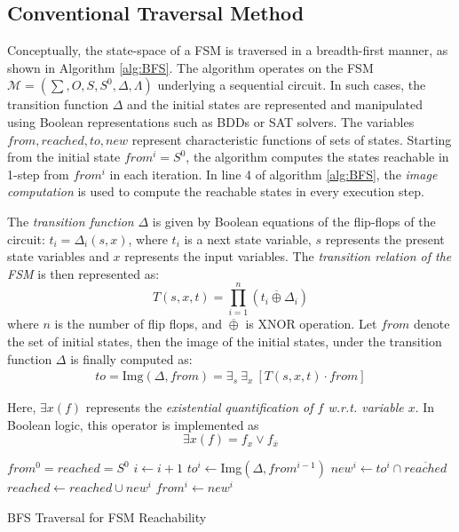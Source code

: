 \subsection{Conventional Traversal Method}
Conceptually, the state-space of a FSM is traversed in a breadth-first
manner, as shown in Algorithm \ref{alg:BFS}. %
The algorithm operates on the FSM $\mathcal{M} = (\sum, O, S, S^0,
\Delta, \Lambda)$ underlying a sequential circuit. In such cases, the
transition function $\Delta$ and the initial states are represented
and manipulated using Boolean representations such as BDDs or SAT
solvers. The variables $from, reached, to, new$ represent
characteristic functions of sets of states. Starting from the initial
state $from^i = S^0$, the algorithm computes the states reachable in
1-step from $from^i$ in each iteration. In line 4 of algorithm
\ref{alg:BFS}, the {\it image computation} is 
used to compute the reachable states in every execution step. 

The {\it transition function} $\Delta$ is given by Boolean equations
  of the flip-flops of the circuit: $t_i = \Delta_i(s, x)$, where
  $t_i$ is a next state variable, $s$ represents the present   state
  variables and $x$ represents the input variables. The {\it
    transition relation of the FSM} is then represented as:  
\begin{equation} 
T(s, x, t) =   \prod_{i=1}^{n} (t_i \overline{\oplus } \Delta_i)
\end{equation}
where $n$ is the number of flip flops, and $\overline{\oplus}$ is XNOR
operation. Let $from$ denote the set of initial states, then the
image of the initial states, under the transition function $\Delta$ is
finally computed as:
\begin{align}
\label{eqn:img}
to = \text{Img}(\Delta, from) = \exists _s ~\exists _x ~[ T(s, x, t)
  \cdot from ] 
\end{align}

Here, $\exists x (f)$ represents the {\it existential quantification
  of $f$ w.r.t. variable $x$}. In Boolean logic, this operator is implemented as
  $$\exists x (f) = f_x\lor f_{\overline{x}}$$


\IncMargin{1em}
\begin{algorithm}[hbt]
\SetAlgoNoLine
\Indm
\Indp

  $from^0 = reached = S^0$\;
  {
  	$i \gets i + 1$\;
	$to^i \gets$Img$(\Delta, from^{i-1})$\;
	$new^i \gets to^i \cap \overline{reached}$\;
  	$reached \gets reached \cup new^i$\;
	$from^i \gets new^i$\;
  }
\caption {BFS Traversal for FSM Reachability}\label{alg:BFS}
\end{algorithm}
\DecMargin{1em}


